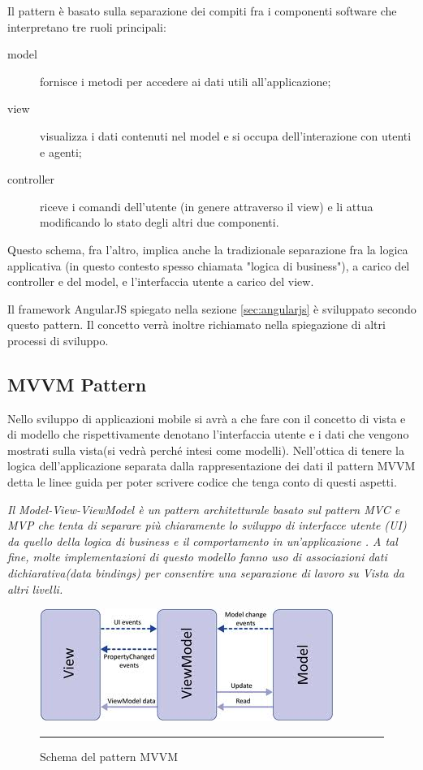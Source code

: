 Il pattern è basato sulla separazione dei compiti fra i componenti software che interpretano tre ruoli principali:
\begin{description}
\item[model] fornisce i metodi per accedere ai dati utili all'applicazione;
\item[view] visualizza i dati contenuti nel model e si occupa dell'interazione con utenti e agenti;
\item[controller] riceve i comandi dell'utente (in genere attraverso il view) e li attua modificando lo stato degli altri due componenti.
\end{description}
Questo schema, fra l'altro, implica anche la tradizionale separazione fra la logica applicativa (in questo contesto spesso chiamata "logica di business"), a carico del controller e del model, e l'interfaccia utente a carico del view.
\hspace*{\fill}\cite{wiki:mvc}

Il framework AngularJS spiegato nella sezione \ref{sec:angularjs} è sviluppato secondo questo pattern. Il concetto verrà inoltre richiamato nella spiegazione di altri processi di sviluppo. 

\subsection{MVVM Pattern}

Nello sviluppo di applicazioni mobile si avrà a che fare con il concetto di vista e di modello che rispettivamente denotano l'interfaccia utente e i dati che vengono mostrati sulla vista(si vedrà perché intesi come modelli). Nell'ottica di tenere la logica dell'applicazione separata dalla rappresentazione dei dati il pattern MVVM detta le linee guida per poter scrivere codice che tenga conto di questi aspetti.

\emph{Il Model-View-ViewModel è un pattern architetturale basato sul pattern MVC e MVP che tenta di separare più chiaramente lo sviluppo di interfacce utente (UI) da quello della logica di business e il comportamento in un'applicazione . A tal fine, molte implementazioni di questo modello fanno uso di associazioni dati dichiarativa(data bindings) per consentire una separazione di lavoro su Vista da altri livelli.}
\hspace*{\fill}\cite{book:mvvm}

\begin{figure}[htbp]
  \centering
    \includegraphics[scale=0.75]{Figures/mvvm-1.jpeg}  
    \rule{35em}{0.5pt}
  \caption[MVVM Pattern]{Schema del pattern MVVM}
  \label{fig:MVVM Schema}
\end{figure}

